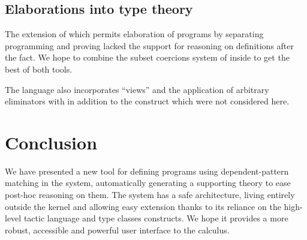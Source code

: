 \subsection{Elaborations into type theory}
The \Program \cite{sozeau.thesis} extension of \Coq
which permits elaboration of \Coq programs by separating programming and
proving lacked the support for reasoning on definitions after the fact.
We hope to combine the subset coercions system of \Program inside 
\Equations to get the best of both tools.

The \Epigram language also incorporates ``views'' and the application of
arbitrary eliminators with  in addition to the 
construct \cite{DBLP:journals/jfp/McBrideM04} which were not considered
here.

\section{Conclusion}
\label{sec:conclusion}

We have presented a new tool for defining programs using
dependent-pattern matching in the \Coq system, automatically 
generating a supporting theory to ease post-hoc reasoning on them.
The system has a safe architecture, living entirely outside the
kernel and allowing easy extension thanks to its reliance on the
high-level tactic language and type classes constructs. We hope it
provides a more robust, accessible and powerful user interface to the
calculus.


